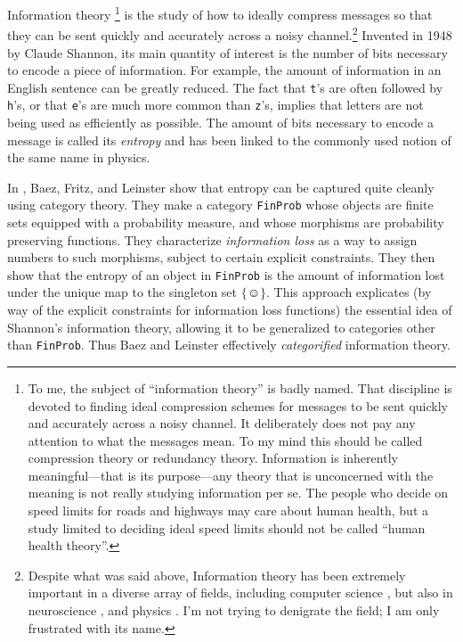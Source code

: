 \documentclass[../main/CT4S-EN-RU]{subfiles}
\begin{document}
\begin{blockENG}
Information theory 
\footnote{To me, the subject of “information theory” is badly named. That discipline is devoted to finding ideal compression schemes for messages to be sent quickly and accurately across a noisy channel. It deliberately does not pay any attention to what the messages mean. To my mind this should be called compression theory or redundancy theory. Information is inherently meaningful—that is its purpose—any theory that is unconcerned with the meaning is not really studying information per se. The people who decide on speed limits for roads and highways may care about human health, but a study limited to deciding ideal speed limits should not be called “human health theory”.} 
is the study of how to ideally compress messages so that they can be sent quickly and accurately across a noisy channel.\footnote{Despite what was said above, Information theory has been extremely important in a diverse array of fields, including computer science \cite{MacK}, but also in neuroscience \cite{Bar}, \cite{Lin} and physics \cite{Eve}. I'm not trying to denigrate the field; I am only frustrated with its name.} Invented in 1948 by Claude Shannon, its main quantity of interest is the number of bits necessary to encode a piece of information. For example, the amount of information in an English sentence can be greatly reduced. The fact that {\tt t}'s are often followed by {\tt h}'s, or that {\tt e}'s are much more common than {\tt z}'s, implies that letters are not being used as efficiently as possible. The amount of bits necessary to encode a message is called its {\em entropy} and has been linked to the commonly used notion of the same name in physics. 
\end{blockENG}

\begin{blockRUS}
\end{blockRUS}

\begin{blockENG}
In \cite{BFL}, Baez, Fritz, and Leinster show that entropy can be captured quite cleanly using category theory. They make a category {\tt FinProb} whose objects are finite sets equipped with a probability measure, and whose morphisms are probability preserving functions. They characterize {\em information loss} as a way to assign numbers to such morphisms, subject to certain explicit constraints. They then show that the entropy of an object in {\tt FinProb} is the amount of information lost under the unique map to the singleton set ${\{☺\}}.$ This approach explicates (by way of the explicit constraints for information loss functions) the essential idea of Shannon's information theory, allowing it to be generalized to categories other than {\tt FinProb}. Thus Baez and Leinster effectively {\em categorified} information theory.
\end{blockENG}
\end{document}

